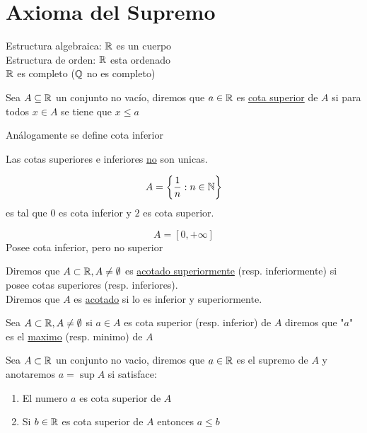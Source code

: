     \chapter{Axioma del Supremo}
    {\raggedleft Estructura algebraica: $\mathbb{R}$ es un cuerpo}\\
    Estructura de orden: $\mathbb{R}$ esta ordenado\\
    $\mathbb{R}$ es completo ($\mathbb{Q}$ no es completo)\\
    \begin{defn}
        Sea $A\subseteq\mathbb{R}$ un conjunto no vacío, diremos que $a\in\mathbb{R}$ es \underline{cota superior} de $A$ si para todos $x\in A$ se tiene que $x\leq a$
    \end{defn}
    \begin{defn}
        Análogamente se define cota inferior
    \end{defn}
    \begin{obs}
        Las cotas superiores e inferiores \underline{no} son unicas.
    \end{obs}
    \begin{ejm}
        \[A=\left\{\frac{1}{n}:n\in\mathbb{N}\right\}\]
        es tal que $0$ es cota inferior y $2$ es cota superior.
    \end{ejm}
    \begin{ejm}
        \[A=[0,+\infty]\]
        Posee cota inferior, pero no superior
    \end{ejm}
    \begin{defn}
        Diremos que $A\subset\mathbb{R},A\neq\emptyset$ es \underline{acotado superiormente} (resp. inferiormente) si posee cotas superiores (resp. inferiores).\\
        Diremos que $A$ es \underline{acotado} si lo es inferior y superiormente.
    \end{defn}
    \begin{defn}
        Sea $A\subset\mathbb{R},A\neq\emptyset$ si $a\in A$ es cota superior (resp. inferior) de $A$ diremos que "$a$" es el \underline{maximo} (resp. minimo) de $A$
    \end{defn}
    \begin{defn}[Supremo]
        Sea $A\subset\mathbb{R}$ un conjunto no vacio, diremos que $a\in\mathbb{R}$ es el supremo de $A$ y anotaremos $a=\sup A$ si satisface:
        \begin{enumerate}
            \item El numero $a$ es cota superior de $A$

            \item Si $b\in\mathbb{R}$ es cota superior de $A$ entonces $a\leq b$
        \end{enumerate}
    \end{defn}

